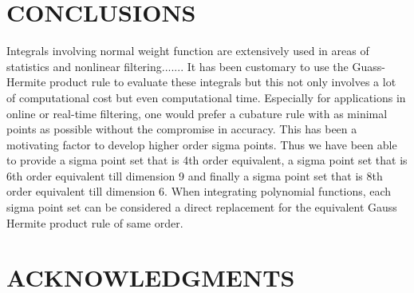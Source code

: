 \documentclass[letterpaper, 10 pt, conference]{ieeeconf}  %
\begin{document}
\section{CONCLUSIONS}
 \indent\indent Integrals involving normal weight function are extensively used in areas of statistics and nonlinear filtering....... It has been customary to use the Guass-Hermite product rule to evaluate these integrals but this not only involves a lot of computational cost but even computational time. Especially for applications in online or real-time filtering, one would prefer a cubature rule with as minimal points as possible without the compromise in accuracy. This has been a motivating factor to develop higher order sigma points. Thus we have been able to provide a sigma point set that is 4th order equivalent, a sigma point set that is 6th order equivalent till dimension 9 and finally a sigma point set that is 8th order equivalent till dimension 6. When integrating polynomial functions, each sigma point set can be considered a direct replacement for the equivalent Gauss Hermite product rule of same order.     
\section{ACKNOWLEDGMENTS}
\end{document}
